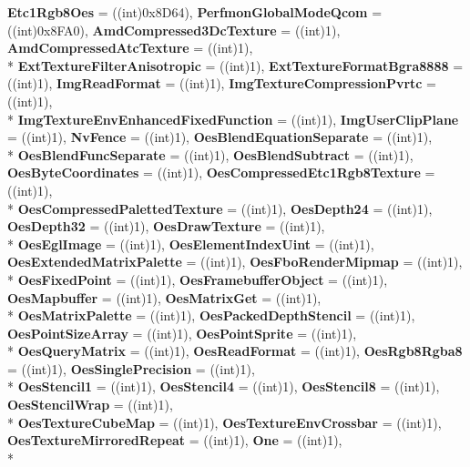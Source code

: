 \begin{DoxyCompactItemize}
{\bfseries Etc1\-Rgb8\-Oes} = ((int)0x8\-D64), 
{\bfseries Perfmon\-Global\-Mode\-Qcom} = ((int)0x8\-F\-A0), 
{\bfseries Amd\-Compressed3\-Dc\-Texture} = ((int)1), 
{\bfseries Amd\-Compressed\-Atc\-Texture} = ((int)1), 
\\*
{\bfseries Ext\-Texture\-Filter\-Anisotropic} = ((int)1), 
{\bfseries Ext\-Texture\-Format\-Bgra8888} = ((int)1), 
{\bfseries Img\-Read\-Format} = ((int)1), 
{\bfseries Img\-Texture\-Compression\-Pvrtc} = ((int)1), 
\\*
{\bfseries Img\-Texture\-Env\-Enhanced\-Fixed\-Function} = ((int)1), 
{\bfseries Img\-User\-Clip\-Plane} = ((int)1), 
{\bfseries Nv\-Fence} = ((int)1), 
{\bfseries Oes\-Blend\-Equation\-Separate} = ((int)1), 
\\*
{\bfseries Oes\-Blend\-Func\-Separate} = ((int)1), 
{\bfseries Oes\-Blend\-Subtract} = ((int)1), 
{\bfseries Oes\-Byte\-Coordinates} = ((int)1), 
{\bfseries Oes\-Compressed\-Etc1\-Rgb8\-Texture} = ((int)1), 
\\*
{\bfseries Oes\-Compressed\-Paletted\-Texture} = ((int)1), 
{\bfseries Oes\-Depth24} = ((int)1), 
{\bfseries Oes\-Depth32} = ((int)1), 
{\bfseries Oes\-Draw\-Texture} = ((int)1), 
\\*
{\bfseries Oes\-Egl\-Image} = ((int)1), 
{\bfseries Oes\-Element\-Index\-Uint} = ((int)1), 
{\bfseries Oes\-Extended\-Matrix\-Palette} = ((int)1), 
{\bfseries Oes\-Fbo\-Render\-Mipmap} = ((int)1), 
\\*
{\bfseries Oes\-Fixed\-Point} = ((int)1), 
{\bfseries Oes\-Framebuffer\-Object} = ((int)1), 
{\bfseries Oes\-Mapbuffer} = ((int)1), 
{\bfseries Oes\-Matrix\-Get} = ((int)1), 
\\*
{\bfseries Oes\-Matrix\-Palette} = ((int)1), 
{\bfseries Oes\-Packed\-Depth\-Stencil} = ((int)1), 
{\bfseries Oes\-Point\-Size\-Array} = ((int)1), 
{\bfseries Oes\-Point\-Sprite} = ((int)1), 
\\*
{\bfseries Oes\-Query\-Matrix} = ((int)1), 
{\bfseries Oes\-Read\-Format} = ((int)1), 
{\bfseries Oes\-Rgb8\-Rgba8} = ((int)1), 
{\bfseries Oes\-Single\-Precision} = ((int)1), 
\\*
{\bfseries Oes\-Stencil1} = ((int)1), 
{\bfseries Oes\-Stencil4} = ((int)1), 
{\bfseries Oes\-Stencil8} = ((int)1), 
{\bfseries Oes\-Stencil\-Wrap} = ((int)1), 
\\*
{\bfseries Oes\-Texture\-Cube\-Map} = ((int)1), 
{\bfseries Oes\-Texture\-Env\-Crossbar} = ((int)1), 
{\bfseries Oes\-Texture\-Mirrored\-Repeat} = ((int)1), 
{\bfseries One} = ((int)1), 
\\*

\end{DoxyCompactItemize}
